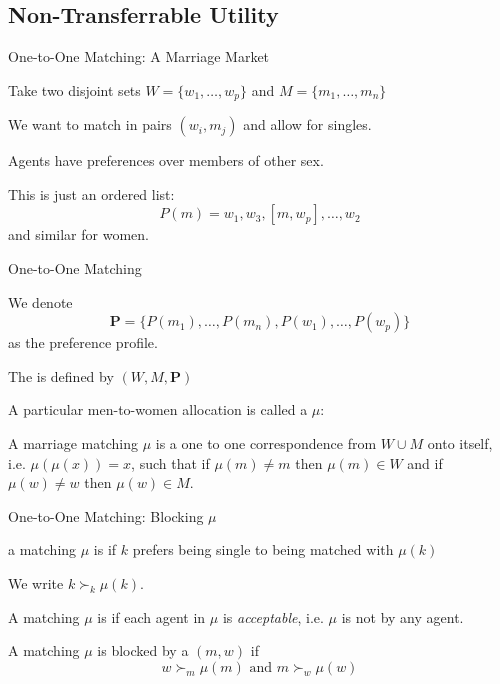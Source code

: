 \documentclass{beamer}%
\begin{document}
\subsection{Non-Transferrable Utility}
\begin{frame}
\tableofcontents[currentsubsection] 
\end{frame}

\begin{frame}{One-to-One Matching: A Marriage Market}
\begin{midi}
\item Take two disjoint sets $W=\{w_1,\dots,w_p\}$ and $M=\{m_1,\dots,m_n\}$
\item We want to match in pairs $(w_i,m_j)$ and allow for singles.
\item Agents have preferences over members of other sex.
\item This is just an ordered list:
\begin{equation*}
P(m) = w_1,w_3,[m,w_p],\dots,w_2
\end{equation*}
and similar for women.
\end{midi}
\end{frame}

\begin{frame}{One-to-One Matching}
\begin{midi}
\item We denote 
\begin{equation*}
\mathbf{P} = \{P(m_1),\dots,P(m_n), P(w_1),\dots,P(w_p)\}
\end{equation*}
as the preference profile. 
\item The  is defined by $(W,M,\mathbf{P})$
\end{midi}
A particular men-to-women allocation is called a  $\mu$: \bigskip
\begin{tcolorbox}[colback=red!5!white,colframe=red!75!black,title=Definition: Marriage Matching,fonttitle=\bfseries] 
A marriage matching $\mu$ is a one to one correspondence from $W \cup M$ onto itself, i.e. $\mu(\mu(x)) = x$, such that if $\mu(m)\neq m$ then $\mu(m) \in W$ and if $\mu(w)\neq w$ then $\mu(w) \in M$.
\end{tcolorbox}
\end{frame}

\begin{frame}{One-to-One Matching: Blocking $\mu$}
\begin{midi}
\item a matching $\mu$ is  if $k$ prefers being single to being matched with $\mu(k)$
\item We write $k \succ_k \mu(k)$.
\item A matching $\mu$ is  if each agent in $\mu$ is \emph{acceptable}, i.e. $\mu$ is not  by any agent.
\item A matching $\mu$ is blocked by a  $(m,w)$ if 
\begin{equation*}
w\succ_m \mu(m) \text{ and } m\succ_w \mu(w)
\end{equation*}
\end{midi}
\end{frame}
\end{document}

